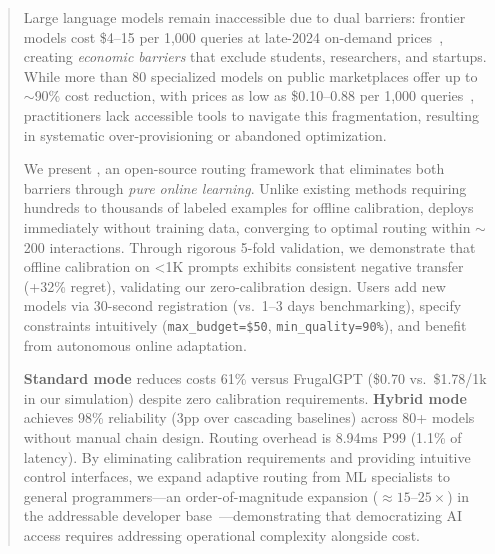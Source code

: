 
\begin{abstract}
Large language models remain inaccessible due to dual barriers: frontier models cost \$4--15 per 1,000 queries at late-2024 on-demand prices~\cite{openai2025pricing,anthropic2025pricing}, creating \emph{economic barriers} that exclude students, researchers, and startups. While more than 80 specialized models on public marketplaces offer up to $\sim$90\% cost reduction, with prices as low as \$0.10--0.88 per 1,000 queries~\cite{openrouter2025models,artificialanalysis2025}, practitioners lack accessible tools to navigate this fragmentation, resulting in systematic over-provisioning or abandoned optimization.

We present \ours{}, an open-source routing framework that eliminates both barriers through \emph{pure online learning}. Unlike existing methods requiring hundreds to thousands of labeled examples for offline calibration, \ours{} deploys immediately without training data, converging to optimal routing within $\sim$200 interactions. Through rigorous 5-fold validation, we demonstrate that offline calibration on <1K prompts exhibits consistent negative transfer (+32\% regret), validating our zero-calibration design. Users add new models via 30-second registration (vs.\ 1--3 days benchmarking), specify constraints intuitively (\texttt{max\_budget=\$50}, \texttt{min\_quality=90\%}), and benefit from autonomous online adaptation.

\textbf{Standard mode} reduces costs 61\% versus FrugalGPT (\$0.70 vs.\ \$1.78/1k in our simulation) despite zero calibration requirements. \textbf{Hybrid mode} achieves 98\% reliability (3pp over cascading baselines) across 80+ models without manual chain design. Routing overhead is 8.94ms P99 (1.1\% of latency). By eliminating calibration requirements and providing intuitive control interfaces, we expand adaptive routing from ML specialists to general programmers---an order-of-magnitude expansion ($\approx 15$--$25\times$) in the addressable developer base~\cite{stackoverflow2024survey,github2025developer}---demonstrating that democratizing AI access requires addressing operational complexity alongside cost.
\end{abstract}

